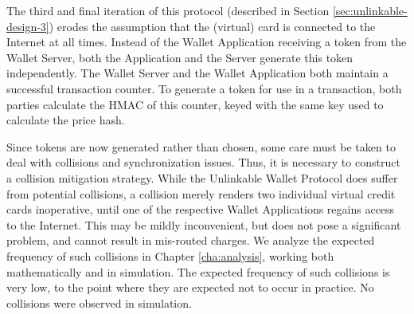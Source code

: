 The third and final iteration of this protocol (described in Section \ref{sec:unlinkable-design-3}) erodes the assumption that the (virtual) card is connected to the Internet at all times.
Instead of the Wallet Application receiving a token from the Wallet Server, both the Application and the Server generate this token independently.
The Wallet Server and the Wallet Application both maintain a successful transaction counter.
To generate a token for use in a transaction, both parties calculate the HMAC of this counter, keyed with the same key used to calculate the price hash.


Since tokens are now generated rather than chosen, some care must be taken to deal with collisions and synchronization issues.
Thus, it is necessary to construct a collision mitigation strategy.
While the Unlinkable Wallet Protocol does suffer from potential collisions,
    a collision merely renders two individual virtual credit cards inoperative, until one of the respective Wallet Applications regains access to the Internet.
This may be mildly inconvenient, but does not pose a significant problem, and cannot result in mis-routed charges.
We analyze the expected frequency of such collisions in Chapter \ref{cha:analysis}, working both mathematically and in simulation.
The expected frequency of such collisions is very low, to the point where they are expected not to occur in practice.
No collisions were observed in simulation.
